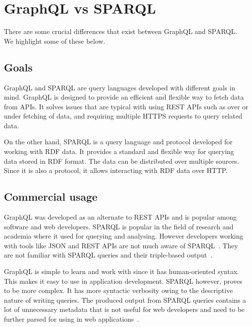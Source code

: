 \section{GraphQL vs SPARQL}
There are some crucial differences that exist between GraphQL and SPARQL. We highlight some of these below.

\subsection{Goals}
GraphQL and SPARQL are query languages developed with different goals in mind. GraphQL is designed to provide an efficient and flexible way to fetch data from APIs. It solves issues that are typical with using REST APIs such as over or under fetching of data, and requiring multiple HTTPS requests to query related data. 

On the other hand, SPARQL is a query language and protocol developed for working with RDF data. It provides a standard and flexible way for querying data stored in RDF format. The data can be distributed over multiple sources. Since it is also a protocol, it allows interacting with RDF data over HTTP. 
 
\subsection{Commercial usage}
GraphQL was developed as an alternate to REST APIs and is popular among software and web developers. 
SPARQL is popular in the field of research and academia where it used for querying and analysing. However developers working with tools like JSON and REST APIs are not much aware of SPARQL~\cite{Angele2022}. They are not familiar with SPARQL queries and their triple-based output~\cite{Angele2022}. 




GraphQL is simple to learn and work with since it has human-oriented syntax. This makes it easy to use in application development. SPARQL however, proves to be more complex. It has more syntactic verbosity owing to the descriptive nature of writing queries. The produced output from SPARQL queries contains a lot of unnecessary metadata that is not useful for web developers and need to be further parsed for using in web applications~\cite{Lisena2018}. 

